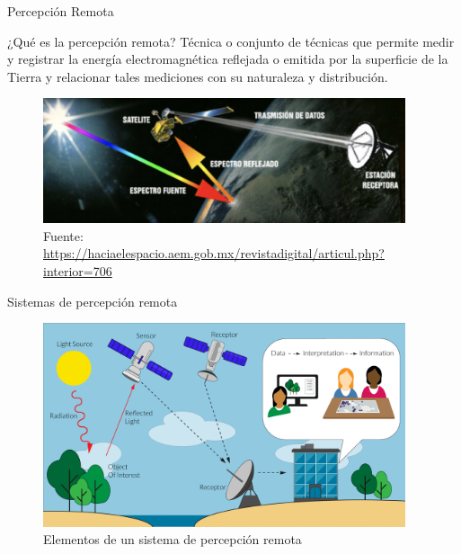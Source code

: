 \begin{frame}{Percepción Remota}
    \begin{block}{¿Qué es la percepción remota?}
        Técnica o conjunto de técnicas que permite medir y registrar la energía
        electromagnética reflejada o emitida por la superficie de la Tierra y 
        relacionar tales mediciones con su naturaleza y distribución.
    \end{block}    

    \begin{figure}
      \begin{center}
        \includegraphics[width=0.95\textwidth]{img/section_03/percepcion_remota}
      \end{center}
      \caption{Fuente: \url{https://haciaelespacio.aem.gob.mx/revistadigital/articul.php?interior=706}}\label{fig:percepcion_remota}
    \end{figure}
    
\end{frame}

\begin{frame}{Sistemas de percepción remota}
  \begin{figure}
    \begin{center}
      \includegraphics[width=0.95\textwidth]{img/section_03/elementos3.jpg}
    \end{center}
    \caption{Elementos de un sistema de percepción remota}
    \label{fig:elementos_percepcion_remota}
  \end{figure}
\end{frame}
  

